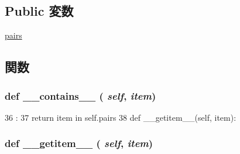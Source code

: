 \subsection*{Public 変数}
\begin{DoxyCompactItemize}
\item 
\hyperlink{classslicc_1_1util_1_1PairContainer_a8b16b1e1994f9c318702b801bd3b8420}{pairs}
\end{DoxyCompactItemize}


\subsection{関数}
\hypertarget{classslicc_1_1util_1_1PairContainer_a31ecdf34e79a47aea99a17eea32b7ac2}{
\subsubsection[{\_\-\_\-contains\_\-\_\-}]{\setlength{\rightskip}{0pt plus 5cm}def \_\-\_\-contains\_\-\_\- ( {\em self}, \/   {\em item})}}
\label{classslicc_1_1util_1_1PairContainer_a31ecdf34e79a47aea99a17eea32b7ac2}



\begin{DoxyCode}
36                                 :
37         return item in self.pairs
38 
    def __getitem__(self, item):
\end{DoxyCode}
\hypertarget{classslicc_1_1util_1_1PairContainer_a50d766f4276c3d8fe330ac8cd344a75f}{
\subsubsection[{\_\-\_\-getitem\_\-\_\-}]{\setlength{\rightskip}{0pt plus 5cm}def \_\-\_\-getitem\_\-\_\- ( {\em self}, \/   {\em item})}}
\label{classslicc_1_1util_1_1PairContainer_a50d766f4276c3d8fe330ac8cd344a75f}



